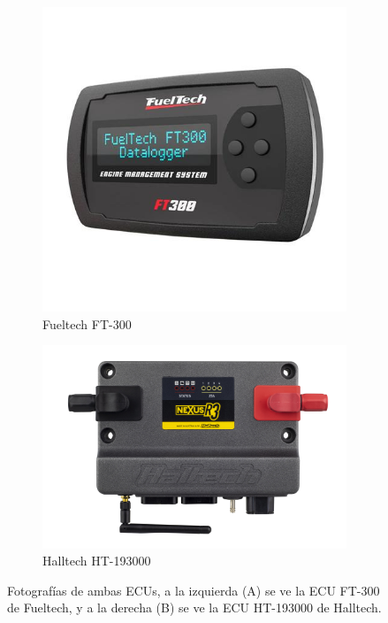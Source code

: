 \begin{figure}[htpb]
\centering
\begin{subfigure}{.4\textwidth}
\centering
\includegraphics[width=\textwidth]{./Figures/fueltech-ft300.jpg}
\caption{Fueltech FT-300}
\label{fig:fueltech}
\end{subfigure}
\hfill
\begin{subfigure}{.5\textwidth}
\centering
\includegraphics[width=\textwidth]{./Figures/HT-193000_00.JPG}
\caption{Halltech HT-193000}
\label{fig:halltech}
\end{subfigure}
\caption{Fotografías de ambas ECUs, a la izquierda (A) se ve la ECU FT-300 de Fueltech, y a la derecha (B) se ve la ECU HT-193000 de Halltech.\protect\footnotemark[1]}
\label{fig:comparativa}
\end{figure}

